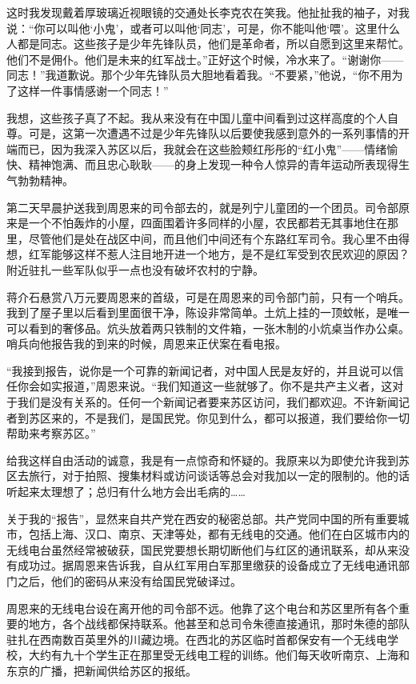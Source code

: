 \documentclass[10pt]{book}
\begin{document}
这时我发现戴着厚玻璃近视眼镜的交通处长李克农在笑我。他扯扯我的袖子，对我说：“你可以叫他‘小鬼’，或者可以叫他‘同志’，可是，你不能叫他‘喂’。这里什么人都是同志。这些孩子是少年先锋队员，他们是革命者，所以自愿到这里来帮忙。他们不是佣仆。他们是未来的红军战士。”正好这个时候，冷水来了。“谢谢你——同志！”我道歉说。那个少年先锋队员大胆地看着我。“不要紧，”他说，“你不用为了这样一件事情感谢一个同志！”

我想，这些孩子真了不起。我从来没有在中国儿童中间看到过这样高度的个人自尊。可是，这第一次遭遇不过是少年先锋队以后要使我感到意外的一系列事情的开端而已，因为我深入苏区以后，我就会在这些脸颊红彤彤的“红小鬼”——情绪愉快、精神饱满、而且忠心耿耿——的身上发现一种令人惊异的青年运动所表现得生气勃勃精神。

第二天早晨护送我到周恩来的司令部去的，就是列宁儿童团的一个团员。司令部原来是一个不怕轰炸的小屋，四面围着许多同样的小屋，农民都若无其事地住在那里，尽管他们是处在战区中间，而且他们中间还有个东路红军司令。我心里不由得想，红军能够这样不惹人注目地开进一个地方，是不是红军受到农民欢迎的原因？附近驻扎一些军队似乎一点也没有破坏农村的宁静。

蒋介石悬赏八万元要周恩来的首级，可是在周恩来的司令部门前，只有一个哨兵。我到了屋子里以后看到里面很干净，陈设非常简单。土炕上挂的一顶蚊帐，是唯一可以看到的奢侈品。炕头放着两只铁制的文件箱，一张木制的小炕桌当作办公桌。哨兵向他报告我的到来的时候，周恩来正伏案在看电报。

“我接到报告，说你是一个可靠的新闻记者，对中国人民是友好的，并且说可以信任你会如实报道，”周恩来说。“我们知道这一些就够了。你不是共产主义者，这对于我们是没有关系的。任何一个新闻记者要来苏区访问，我们都欢迎。不许新闻记者到苏区来的，不是我们，是国民党。你见到什么，都可以报道，我们要给你一切帮助来考察苏区。”

给我这样自由活动的诚意，我是有一点惊奇和怀疑的。我原来以为即使允许我到苏区去旅行，对于拍照、搜集材料或访问谈话等总会对我加以一定的限制的。他的话听起来太理想了；总归有什么地方会出毛病的……

关于我的“报告”，显然来自共产党在西安的秘密总部。共产党同中国的所有重要城市，包括上海、汉口、南京、天津等处，都有无线电的交通。他们在白区城市内的无线电台虽然经常被破获，国民党要想长期切断他们与红区的通讯联系，却从来没有成功过。据周恩来告诉我，自从红军用白军那里缴获的设备成立了无线电通讯部门之后，他们的密码从来没有给国民党破译过。

周恩来的无线电台设在离开他的司令部不远。他靠了这个电台和苏区里所有各个重要的地方，各个战线都保持联系。他甚至和总司令朱德直接通讯，那时朱德的部队驻扎在西南数百英里外的川藏边境。在西北的苏区临时首都保安有一个无线电学校，大约有九十个学生正在那里受无线电工程的训练。他们每天收听南京、上海和东京的广播，把新闻供给苏区的报纸。
\end{document}
